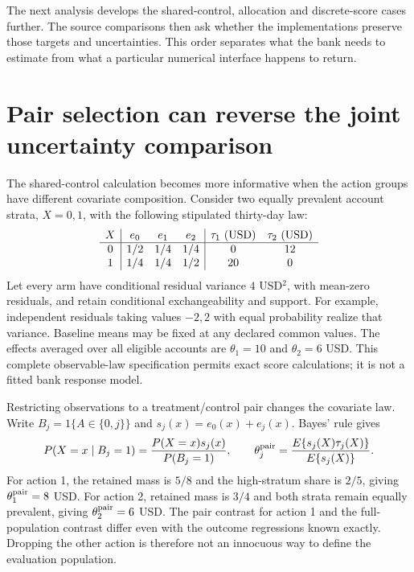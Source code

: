 The next analysis develops the shared-control, allocation and discrete-score
cases further. The source comparisons then ask whether the implementations
preserve those targets and uncertainties. This order separates what the bank
needs to estimate from what a particular numerical interface happens to return.
\label{exec17:s4-end}


\section{Pair selection can reverse the joint uncertainty comparison}
\label{exec17:s4-common-population}

The shared-control calculation becomes more informative when the action groups
have different covariate composition. Consider two equally prevalent account
strata, $X=0,1$, with the following stipulated thirty-day law:
\[
\begin{array}{c|ccc|cc}
 X&e_0&e_1&e_2&\tau_1\ ({\rm USD})&\tau_2\ ({\rm USD})\\ \hline
 0&1/2&1/4&1/4&0&12\\
 1&1/4&1/4&1/2&20&0
\end{array}
\]
Let every arm have conditional residual variance $4$ USD$^2$, with
mean-zero residuals, and retain conditional exchangeability and support.
For example, independent residuals taking values $-2,2$ with equal
probability realize that variance. Baseline means may be fixed at any
declared common values. The effects averaged over all eligible accounts are
$\theta_1=10$ and $\theta_2=6$ USD. This complete observable-law specification
permits exact score calculations; it is not a fitted bank response model.
\citep{exec17_s4_extension}

Restricting observations to a treatment/control pair changes the covariate
law. Write $B_j=1\{A\in\{0,j\}\}$ and
$s_j(x)=e_0(x)+e_j(x)$. Bayes' rule gives
\begin{equation}
 P(X=x\mid B_j=1)=\frac{P(X=x)s_j(x)}{P(B_j=1)},\qquad
 \theta_j^{\rm pair}=
       \frac{E\{s_j(X)\tau_j(X)\}}{E\{s_j(X)\}}.
 \label{exec17:s4-pair-target}
\end{equation}
For action 1, the retained mass is $5/8$ and the high-stratum share is
$2/5$, giving $\theta_1^{\rm pair}=8$ USD. For action 2, retained mass is
$3/4$ and both strata remain equally prevalent, giving
$\theta_2^{\rm pair}=6$ USD. The pair contrast for action 1 and the
full-population contrast differ even with the outcome regressions known
exactly. Dropping the other action is therefore not an innocuous way to
define the evaluation population.

